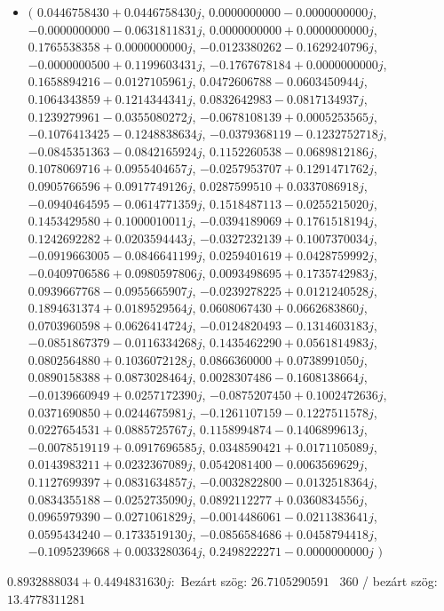 \documentclass[14pt,a4paper]{article}
\begin{document}
\begin{itemize}
\item
$\big($
$0.0446758430+0.0446758430j$, $0.0000000000-0.0000000000j$, $-0.0000000000-0.0631811831j$, $0.0000000000+0.0000000000j$, $0.1765538358+0.0000000000j$, $-0.0123380262-0.1629240796j$, $-0.0000000500+0.1199603431j$, $-0.1767678184+0.0000000000j$, $0.1658894216-0.0127105961j$, $0.0472606788-0.0603450944j$, $0.1064343859+0.1214344341j$, $0.0832642983-0.0817134937j$, $0.1239279961-0.0355080272j$, $-0.0678108139+0.0005253565j$, $-0.1076413425-0.1248838634j$, $-0.0379368119-0.1232752718j$, $-0.0845351363-0.0842165924j$, $0.1152260538-0.0689812186j$, $0.1078069716+0.0955404657j$, $-0.0257953707+0.1291471762j$, $0.0905766596+0.0917749126j$, $0.0287599510+0.0337086918j$, $-0.0940464595-0.0614771359j$, $0.1518487113-0.0255215020j$, $0.1453429580+0.1000010011j$, $-0.0394189069+0.1761518194j$, $0.1242692282+0.0203594443j$, $-0.0327232139+0.1007370034j$, $-0.0919663005-0.0846641199j$, $0.0259401619+0.0428759992j$, $-0.0409706586+0.0980597806j$, $0.0093498695+0.1735742983j$, $0.0939667768-0.0955665907j$, $-0.0239278225+0.0121240528j$, $0.1894631374+0.0189529564j$, $0.0608067430+0.0662683860j$, $0.0703960598+0.0626414724j$, $-0.0124820493-0.1314603183j$, $-0.0851867379-0.0116334268j$, $0.1435462290+0.0561814983j$, $0.0802564880+0.1036072128j$, $0.0866360000+0.0738991050j$, $0.0890158388+0.0873028464j$, $0.0028307486-0.1608138664j$, $-0.0139660949+0.0257172390j$, $-0.0875207450+0.1002472636j$, $0.0371690850+0.0244675981j$, $-0.1261107159-0.1227511578j$, $0.0227654531+0.0885725767j$, $0.1158994874-0.1406899613j$, $-0.0078519119+0.0917696585j$, $0.0348590421+0.0171105089j$, $0.0143983211+0.0232367089j$, $0.0542081400-0.0063569629j$, $0.1127699397+0.0831634857j$, $-0.0032822800-0.0132518364j$, $0.0834355188-0.0252735090j$, $0.0892112277+0.0360834556j$, $0.0965979390-0.0271061829j$, $-0.0014486061-0.0211383641j$, $0.0595434240-0.1733519130j$, $-0.0856584686+0.0458794418j$, $-0.1095239668+0.0033280364j$, $0.2498222271-0.0000000000j$
$\big)$
\end{itemize}
$0.8932888034+0.4494831630j$:\
Bezárt szög: $26.7105290591$ \
360 / bezárt szög: $13.4778311281$\
\end{document}
